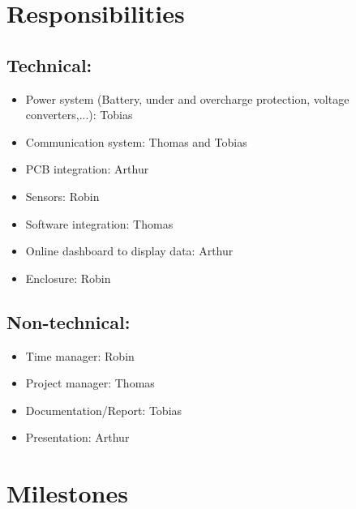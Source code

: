 \documentclass[]{article}
\begin{document}
	\section{Responsibilities}
	\subsection{Technical:}
	\begin{itemize}
		\item Power system (Battery, under and overcharge protection, voltage converters,...): Tobias
		\item Communication system: Thomas and Tobias
		\item PCB integration: Arthur
		\item Sensors: Robin
		\item Software integration: Thomas
		\item Online dashboard to display data: Arthur
		\item Enclosure: Robin
	\end{itemize}

	\subsection{Non-technical: }
	\begin{itemize}
		\item Time manager: Robin
		\item Project manager: Thomas
		\item Documentation/Report: Tobias
		\item Presentation: Arthur
	\end{itemize}

	\section{Milestones}
\end{document}
